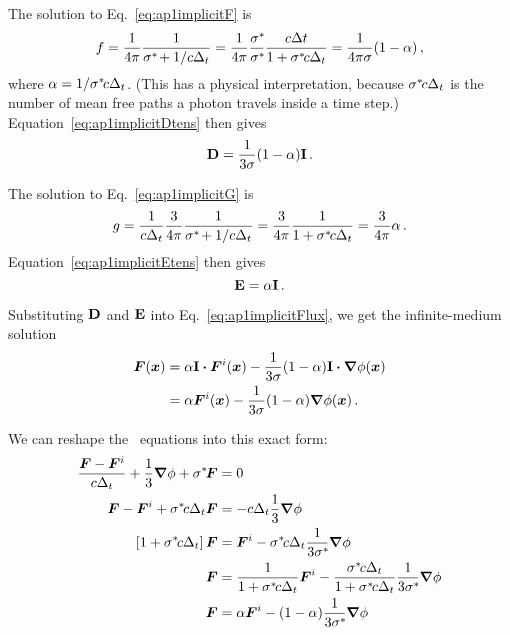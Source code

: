 The solution to Eq.~\eqref{eq:ap1implicitF} is
\begin{equation*}
  f
  = \frac{1}{4\pi} \frac{1}{\sigma^{*\!} + 1 /c \Delta_t}
  = \frac{1}{4\pi} \frac{\sigma^{*\!}}{\sigma^{*\!}} \frac{c \Delta t}{1 + \sigma^{*\!} c \Delta_t}
  = \frac{1}{4\pi \sigma} ( 1 - \alpha) \,,
\end{equation*}
where $\alpha = 1/ \sigma^{*\!} c \Delta_t$. (This has a physical
interpretation, because $\sigma^{*\!} c \Delta_t$ is the number of mean free
paths a photon travels inside a time step.) Equation~\eqref{eq:ap1implicitDtens}
then gives
\begin{equation*}
  \mathbf{D} = \frac{1}{3 \sigma} ( 1 - \alpha) \mathbf{I}\,.
\end{equation*}

The solution to Eq.~\eqref{eq:ap1implicitG} is
\begin{equation*}
  g
  = \frac{1}{c \Delta_t} \frac{3}{4\pi} \frac{1}{\sigma^{*\!} + 1 /c \Delta_t}
  = \frac{3}{4\pi} \frac{1}{1 + \sigma^{*\!} c \Delta_t}
  = \frac{3}{4\pi} \alpha \,.
\end{equation*}
Equation~\eqref{eq:ap1implicitEtens} then gives
\begin{equation*}
  \mathbf{E} = \alpha \mathbf{I}\,.
\end{equation*}

Substituting $\mathbf{D}$ and $\mathbf{E}$ into Eq.~\eqref{eq:ap1implicitFlux}, we get the
infinite-medium solution
\begin{align*}
  \bm{F}(\bm{x})
  &= \alpha \mathbf{I} \bm{\cdot} \bm{F}^i(\bm{x})
  - \frac{1}{3 \sigma} ( 1 - \alpha) \mathbf{I} \bm{\cdot} \bm{\nabla} \phi (\bm{x}) 
  \\
  &= \alpha \bm{F}^i(\bm{x})
  - \frac{1}{3 \sigma} ( 1 - \alpha) \bm{\nabla} \phi (\bm{x})\,.
\end{align*}

We can reshape the \Pone\ equations into this exact form:
\begin{align*}
  \frac{\vec{F} - \vec{F}^i}{c \Delta_t} + \frac{1}{3} \grad \phi
  + \sigmast \vec{F} &= 0
  \\
  \vec{F} - \vec{F}^i 
  + \sigmast c \Delta_t \vec{F}
  &= - c \Delta_t \frac{1}{3} \grad \phi
  \\
  \left[ 1 + \sigmast c \Delta_t \right] \vec{F}
  &= \vec{F}^i - \sigmast c \Delta_t \frac{1}{3\sigmast} \grad \phi
  \\
  \vec{F}
  &= \frac{1}{1 + \sigmast c \Delta_t} \vec{F}^i - \frac{\sigmast c
  \Delta_t}{1 + \sigmast c \Delta_t} \frac{1}{3\sigmast} \grad \phi
  \\
  \vec{F}
  &= \alpha \vec{F}^i - (1 - \alpha) \frac{1}{3\sigmast} \grad \phi
\end{align*}

